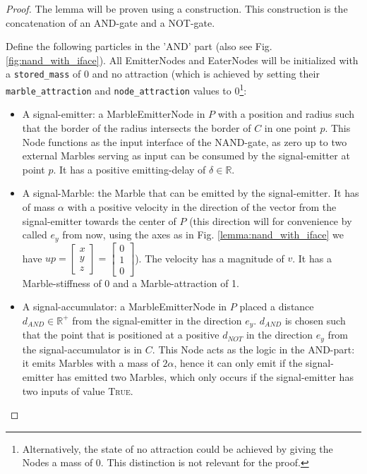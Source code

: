 \begin{proof}
    The lemma will be proven using a construction. This construction is the concatenation of an AND-gate and a NOT-gate.
    
    Define the following particles in the 'AND' part (also see Fig. \ref{fig:nand_with_iface}). All EmitterNodes and EaterNodes will be initialized with a \texttt{stored\_mass} of 0 and no attraction (which is achieved by setting their \texttt{marble\_attraction} and \texttt{node\_attraction} values to 0\footnote{Alternatively, the state of no attraction could be achieved by giving the Nodes a mass of 0. This distinction is not relevant for the proof.}:
    \begin{itemize}
        \item A signal-emitter: a MarbleEmitterNode in $P$ with a position and radius such that the border of the radius intersects the border of $C$ in one point $p$. This Node functions as the input interface of the NAND-gate, as zero up to two external Marbles serving as input can be consumed by the signal-emitter at point $p$. It has a positive emitting-delay of $\delta \in \mathbb{R}$.
        
        \item A signal-Marble: the Marble that can be emitted by the signal-emitter. It has of mass $\alpha$ with a positive velocity in the direction of the vector from the signal-emitter towards the center of $P$ (this direction will for convenience by called $e_y$ from now, using the axes as in Fig. \ref{lemma:nand_with_iface} we have $up = \begin{bmatrix}x\\ y\\ z\end{bmatrix} = \begin{bmatrix}0\\ 1\\ 0\end{bmatrix}$). The velocity has a magnitude of $v$. It has a Marble-stiffness of 0 and a Marble-attraction of 1.
        
        \item A signal-accumulator: a MarbleEmitterNode in $P$ placed a distance $d_{AND} \in \mathbb{R}^{+}$ from the signal-emitter in the direction $e_y$. $d_{AND}$ is chosen such that the point that is positioned at a positive $d_{NOT}$ in the direction $e_y$ from the signal-accumulator is in $C$. This Node acts as the logic in the AND-part: it emits Marbles with a mass of $2\alpha$, hence it can only emit if the signal-emitter has emitted two Marbles, which only occurs if the signal-emitter has two inputs of value \textsc{True}.
        

\end{itemize}
\end{proof}
